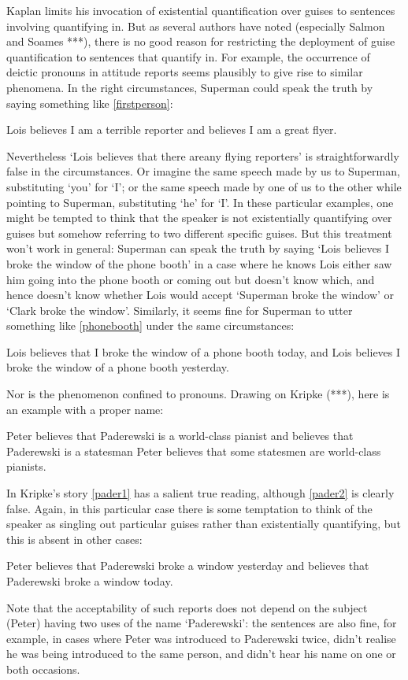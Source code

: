 \documentclass[If.tex]{subfiles}
\begin{document}
Kaplan limits his invocation of existential quantification over guises to sentences involving quantifying in.  But as several authors have noted (especially Salmon and Soames ***), there is no good reason for restricting the deployment of guise quantification to sentences that quantify in.  For example, the occurrence of deictic pronouns in attitude reports seems plausibly to give rise to similar phenomena.  In the right circumstances, Superman could speak the truth by saying something like \ref{firstperson}:
\begin{prop}
    \nitem \label{firstperson}
    Lois believes I am a terrible reporter and believes I am a great flyer.  
\end{prop}
Nevertheless ‘Lois believes that there areany flying reporters’ is straightforwardly false in the circumstances.  Or imagine the same speech made by us to Superman, substituting ‘you’ for ‘I’; or the same speech made by one of us to the other while pointing to Superman, substituting ‘he’ for ‘I’.  In these particular examples, one might be tempted to think that the speaker is not existentially quantifying over guises but somehow referring to two different specific guises.  But this treatment won't work in general: Superman can speak the truth by saying ‘Lois believes I broke the window of the phone booth’ in a case where he knows Lois either saw him going into the phone booth or coming out but doesn't know which, and hence doesn't know whether Lois would accept ‘Superman broke the window’ or ‘Clark broke the window’.  Similarly, it seems fine for Superman to utter something like \ref{phonebooth} under the same circumstances:
\begin{prop}
    \nitem \label{phonebooth}
    Lois believes that I broke the window of a phone booth today, and Lois believes I broke the window of a phone booth yesterday.  
\end{prop}

Nor is the phenomenon confined to pronouns.  Drawing on Kripke (***), here is an example with a proper name:
\begin{prop}
    \nitem \label{pader1}
    Peter believes that Paderewski is a world-class pianist and believes that Paderewski is a statesman
    \nitem \label{pader2}
    Peter believes that some statesmen are world-class pianists.
\end{prop}
In Kripke's story \ref{pader1} has a salient true reading, although \ref{pader2} is clearly false.  Again, in this particular case there is some temptation to think of the speaker as singling out particular guises rather than existentially quantifying, but this is absent in other cases:
\begin{prop}
    \nitem
    Peter believes that Paderewski broke a window yesterday and believes that Paderewski broke a window today.
\end{prop}
Note that the acceptability of such reports does not depend on the subject (Peter) having two uses of the name ‘Paderewski’: the sentences are also fine, for example, in cases where Peter was introduced to Paderewski twice, didn't realise he was being introduced to the same person, and didn't hear his name on one or both occasions.  
\end{document}
